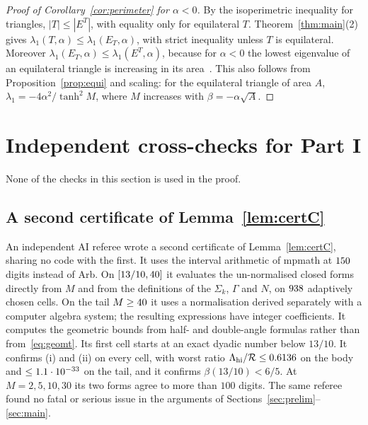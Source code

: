\documentclass[11pt]{article}
\theoremstyle{remark}
\newcommand{\E}{E}
\begin{document}
\begin{proof}[Proof of Corollary~\ref{cor:perimeter} for $\alpha<0$]
By the isoperimetric inequality for triangles, $|T|\le|\E^T|$, with equality only for equilateral $T$.
Theorem~\ref{thm:main}(2) gives $\lambda_1(T,\alpha)\le\lambda_1(\E_T,\alpha)$, with strict inequality unless
$T$ is equilateral. Moreover $\lambda_1(\E_T,\alpha)\le\lambda_1(\E^T,\alpha)$, because for $\alpha<0$ the
lowest eigenvalue of an equilateral triangle is increasing in its area~\cite[Prop.~2.3]{KLV}. This also
follows from Proposition~\ref{prop:equi} and scaling: for the equilateral triangle of area $A$,
$\lambda_1=-4\alpha^2/\tanh^2M$, where $M$ increases with $\beta=-\alpha\sqrt A$.
\end{proof}

\section{Independent cross-checks for Part I}\label{sec:cross}

None of the checks in this section is used in the proof.

\subsection{A second certificate of Lemma~\ref{lem:certC}}
An independent AI referee wrote a second certificate of Lemma~\ref{lem:certC}, sharing no code with the
first. It uses the interval arithmetic of mpmath at $150$ digits instead of Arb. On
$[13/10,40]$ it evaluates the un-normalised closed forms directly from $M$ and from the
definitions of the $\Sigma_k$, $\Gamma$ and $N$, on $938$ adaptively chosen cells. On the tail
$M\ge40$ it uses a normalisation derived separately with a computer algebra system; the
resulting expressions have integer coefficients. It computes the geometric bounds from half- and
double-angle formulas rather than from~\eqref{eq:geomt}. Its first cell starts at an exact dyadic
number below $13/10$. It confirms (i) and (ii) on every cell, with
worst ratio $\Lambda_{\rm hi}/\mathcal R\le0.6136$ on the body and $\le1.1\cdot10^{-33}$ on the tail,
and it confirms $\beta(13/10)<6/5$. At $M=2,5,10,30$ its two forms agree to more than $100$ digits. The same referee found no fatal or serious issue in the arguments of
Sections~\ref{sec:prelim}--\ref{sec:main}.
\end{document}
